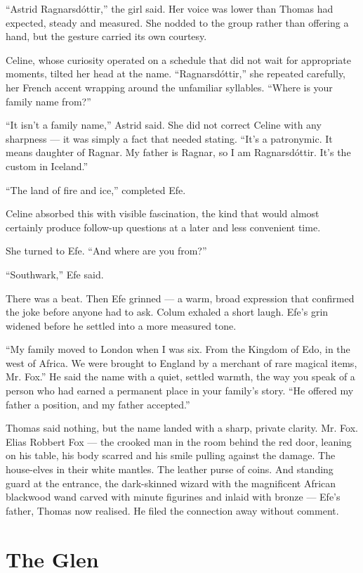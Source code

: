 \enquote{Astrid Ragnarsdóttir,} the girl said. Her voice was lower than Thomas had expected, steady and measured. She nodded to the group rather than offering a hand, but the gesture carried its own courtesy.
 
Celine, whose curiosity operated on a schedule that did not wait for appropriate moments, tilted her head at the name. \enquote{Ragnarsdóttir,} she repeated carefully, her French accent wrapping around the unfamiliar syllables. \enquote{Where is your family name from?}
 
\enquote{It isn't a family name,} Astrid said. She did not correct Celine with any sharpness --- it was simply a fact that needed stating. \enquote{It's a patronymic. It means daughter of Ragnar. My father is Ragnar, so I am Ragnarsdóttir. It's the custom in Iceland.}
 
\enquote{The land of fire and ice,} completed Efe.
 
Celine absorbed this with visible fascination, the kind that would almost certainly produce follow-up questions at a later and less convenient time.
 
She turned to Efe. \enquote{And where are you from?}
 
\enquote{Southwark,} Efe said.
 
There was a beat. Then Efe grinned --- a warm, broad expression that confirmed the joke before anyone had to ask. Colum exhaled a short laugh. Efe's grin widened before he settled into a more measured tone.
 
\enquote{My family moved to London when I was six. From the Kingdom of Edo, in the west of Africa. We were brought to England by a merchant of rare magical items, Mr. Fox.} He said the name with a quiet, settled warmth, the way you speak of a person who had earned a permanent place in your family's story. \enquote{He offered my father a position, and my father accepted.}
 
Thomas said nothing, but the name landed with a sharp, private clarity. Mr. Fox. Elias Robbert Fox --- the crooked man in the room behind the red door, leaning on his table, his body scarred and his smile pulling against the damage. The house-elves in their white mantles. The leather purse of coins. And standing guard at the entrance, the dark-skinned wizard with the magnificent African blackwood wand carved with minute figurines and inlaid with bronze --- Efe's father, Thomas now realised. He filed the connection away without comment.
 
\section*{The Glen}
 
